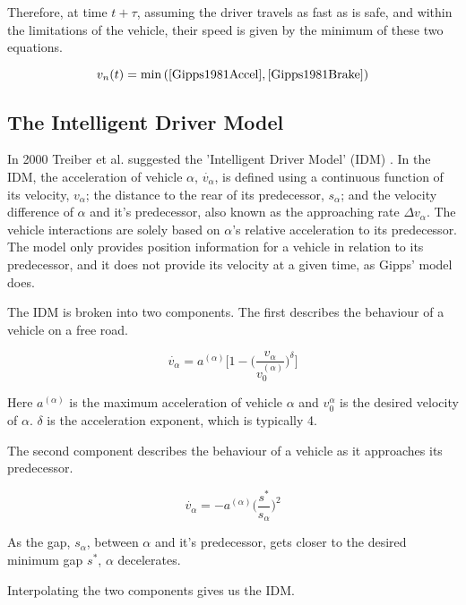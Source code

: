 \begin{appendices}
Therefore, at time $t + \tau$, assuming the driver travels as fast as is safe, and within the limitations of the vehicle, their speed is given by the minimum of these two equations.

\begin{equation}
v_n(t) = \min{(\eqref{Gipps1981Accel},\eqref{Gipps1981Brake})}
\end{equation}

\subsection{The Intelligent Driver Model}
\label{subsec:The Intelligent Driver Model}
In 2000 Treiber et al. suggested the 'Intelligent Driver Model' (IDM) \citep{Treiber2000}. In the IDM, the acceleration of vehicle $\alpha$, $\dot{v_\alpha}$, is defined using a continuous function of its velocity, $v_\alpha$; the distance to the rear of its predecessor, $s_\alpha$; and the velocity difference of $\alpha$ and it's predecessor, also known as the approaching rate $\Delta v_\alpha$. The vehicle interactions are solely based on $\alpha$'s relative acceleration to its predecessor. The model only provides position information for a vehicle in relation to its predecessor, and it does not provide its velocity at a given time, as Gipps' model does. 

The IDM is broken into two components. The first describes the behaviour of a vehicle on a free road.

\begin{equation}
\dot{v_\alpha} = a^{(\alpha)}\Biggl[1 - \biggl(\frac{v_\alpha}{v_0^{(\alpha)}}\biggr)^\delta\Biggr]
\end{equation}

Here $a^{(\alpha)}$ is the maximum acceleration of vehicle $\alpha$ and $v_0^{\alpha}$ is the desired velocity of $\alpha$. $\delta$ is the acceleration exponent, which is typically 4. 

The second component describes the behaviour of a vehicle as it approaches its predecessor. 

\begin{equation}
\dot{v_\alpha} = - a^{(\alpha)}\biggl(\frac{s^*}{s_\alpha}\biggr)^2
\end{equation}

As the gap, $s_\alpha$, between $\alpha$ and it's predecessor, gets closer to the desired minimum gap $s^*$, $\alpha$ decelerates.

Interpolating the two components gives us the IDM. 


\end{appendices}
